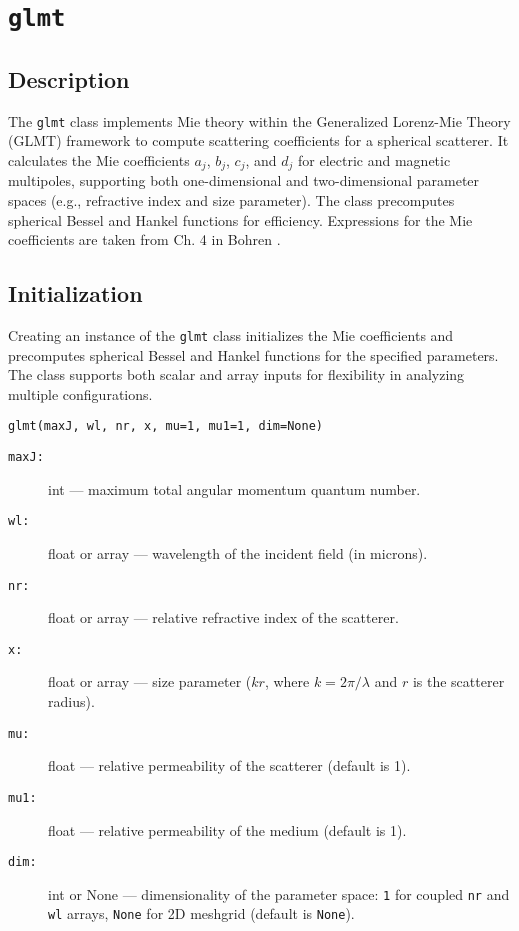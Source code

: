\section{\texttt{glmt}}

\subsection{Description}
The \texttt{glmt} class implements Mie theory within the Generalized Lorenz-Mie Theory (GLMT) framework to compute scattering coefficients for a spherical scatterer. It calculates the Mie coefficients \( a_j \), \( b_j \), \( c_j \), and \( d_j \) for electric and magnetic multipoles, supporting both one-dimensional and two-dimensional parameter spaces (e.g., refractive index and size parameter). The class precomputes spherical Bessel and Hankel functions for efficiency. Expressions for the Mie coefficients are taken from Ch. 4 in Bohren \cite{bohren}.

\subsection{Initialization}
Creating an instance of the \texttt{glmt} class initializes the Mie coefficients and precomputes spherical Bessel and Hankel functions for the specified parameters. The class supports both scalar and array inputs for flexibility in analyzing multiple configurations.

\begin{verbatim}
glmt(maxJ, wl, nr, x, mu=1, mu1=1, dim=None)
\end{verbatim}

\begin{description}
    \item[\texttt{maxJ:}] int — maximum total angular momentum quantum number.
    \item[\texttt{wl:}] float or array — wavelength of the incident field (in microns).
    \item[\texttt{nr:}] float or array — relative refractive index of the scatterer.
    \item[\texttt{x:}] float or array — size parameter (\( k r \), where \( k = 2\pi / \lambda \) and \( r \) is the scatterer radius).
    \item[\texttt{mu:}] float — relative permeability of the scatterer (default is 1).
    \item[\texttt{mu1:}] float — relative permeability of the medium (default is 1).
    \item[\texttt{dim:}] int or None — dimensionality of the parameter space: \texttt{1} for coupled \texttt{nr} and \texttt{wl} arrays, \texttt{None} for 2D meshgrid (default is \texttt{None}).
\end{description}

